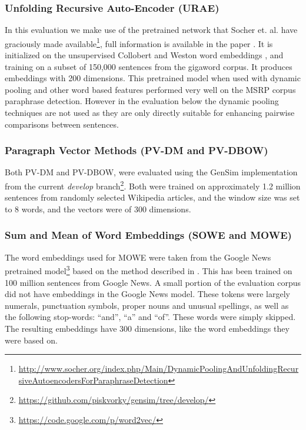\documentclass[]{book}
\begin{document}
\subsubsection{Unfolding Recursive Auto-Encoder (URAE)}

In this evaluation we make use of the pretrained network that Socher
et. al. have graciously made available\footnote{\href{http://www.socher.org/index.php/Main/DynamicPoolingAndUnfoldingRecursiveAutoencodersForParaphraseDetection}{http://www.socher.org/index.php/Main/DynamicPoolingAndUnfoldingRecursiveAutoencodersForParaphraseDetection}},
full information is available in the paper \citep{SocherEtAl2011:PoolRAE}.
It is initialized on the unsupervised Collobert and Weston word embeddings \citep{collobert2008unified},
and training on a subset of 150,000 sentences from the gigaword corpus.
It produces embeddings with 200 dimensions. This pretrained model
when used with dynamic pooling and other word based features performed
very well on the MSRP corpus paraphrase detection. However in the
evaluation below the dynamic pooling techniques are not used as they
are only directly suitable for enhancing pairwise comparisons between
sentences.


\subsubsection{Paragraph Vector Methods (PV-DM and PV-DBOW)}

Both PV-DM and PV-DBOW, were evaluated using the GenSim implementation
\citep{rehurek_lrec} from the current \emph{develop} branch\footnote{\href{https://github.com/piskvorky/gensim/tree/develop/}{https://github.com/piskvorky/gensim/tree/develop/}}.
Both were trained on approximately 1.2 million sentences from randomly
selected Wikipedia articles, and the window size was set to 8 words,
and the vectors were of 300 dimensions.


\subsubsection{Sum and Mean of Word Embeddings (SOWE and MOWE)}

The word embeddings used for MOWE were taken from the Google News
pretrained model\footnote{\href{https://code.google.com/p/word2vec/}{https://code.google.com/p/word2vec/}}
based on the method described in \citep{mikolovSkip}. This has been
trained on 100 million sentences from Google News. A small portion
of the evaluation corpus did not have embeddings in the Google News
model. These tokens were largely numerals, punctuation symbols, proper
nouns and unusual spellings, as well as the following stop-words: ``and'',
``a'' and ``of''. These words were simply skipped. The resulting
embeddings have 300 dimensions, like the word embeddings they were
based on.
\end{document}
